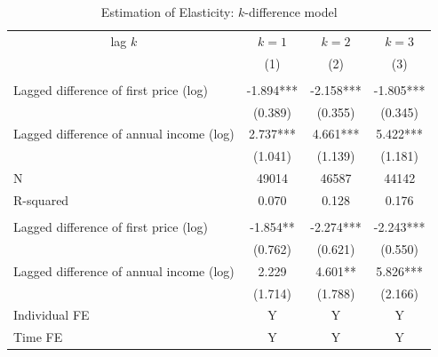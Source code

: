 \documentclass[ review  , 3p ]{elsarticle}
\begin{document}
  \begin{table}

  \caption{\label{tab:kablekDiffElasticity}Estimation of Elasticity: $k$-difference model}
  \centering
  \fontsize{7}{9}\selectfont
  \begin{threeparttable}
  \begin{tabular}[t]{lccc}
  \toprule
  \multicolumn{1}{c}{lag $k$} & \multicolumn{1}{c}{$k = 1$} & \multicolumn{1}{c}{$k = 2$} & \multicolumn{1}{c}{$k = 3$} \\
  \cmidrule(l{3pt}r{3pt}){1-1} \cmidrule(l{3pt}r{3pt}){2-2} \cmidrule(l{3pt}r{3pt}){3-3} \cmidrule(l{3pt}r{3pt}){4-4}
   & (1) & (2) & (3)\\
  \midrule
  \addlinespace[0.3em]
  \multicolumn{4}{l}{\textbf{Overall Elasticity}}\\
  \hspace{1em}Lagged difference of first price (log) & -1.894*** & -2.158*** & -1.805***\\
  \hspace{1em} & (0.389) & (0.355) & (0.345)\\
  \hspace{1em}Lagged difference of annual income (log) & 2.737*** & 4.661*** & 5.422***\\
  \hspace{1em} & (1.041) & (1.139) & (1.181)\\
  \hspace{1em}N & 49014 & 46587 & 44142\\
  \hspace{1em}R-squared & 0.070 & 0.128 & 0.176\\
  \addlinespace[0.3em]
  \multicolumn{4}{l}{\textbf{Intensive-Margin Elasticity}}\\
  \hspace{1em}Lagged difference of first price (log) & -1.854** & -2.274*** & -2.243***\\
  \hspace{1em} & (0.762) & (0.621) & (0.550)\\
  \hspace{1em}Lagged difference of annual income (log) & 2.229 & 4.601** & 5.826***\\
  \hspace{1em} & (1.714) & (1.788) & (2.166)\\
  \hspace{1em}Individual FE & Y & Y & Y\\
  \hspace{1em}Time FE & Y & Y & Y\\

\end{tabular}
\end{threeparttable}
\end{table}
\end{document}
